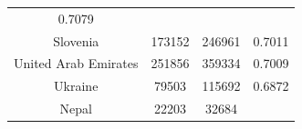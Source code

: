 \documentclass[10pt,]{article}
\begin{document}
\begin{longtable}[]{@{}cccc@{}}
\begin{minipage}[t]{0.18\columnwidth}
0.7079\strut
\end{minipage}\tabularnewline
\begin{minipage}[t]{0.26\columnwidth}\centering\strut
Slovenia\strut
\end{minipage} & \begin{minipage}[t]{0.12\columnwidth}\centering\strut
173152\strut
\end{minipage} & \begin{minipage}[t]{0.10\columnwidth}\centering\strut
246961\strut
\end{minipage} & \begin{minipage}[t]{0.18\columnwidth}\centering\strut
0.7011\strut
\end{minipage}\tabularnewline
\begin{minipage}[t]{0.26\columnwidth}\centering\strut
United Arab Emirates\strut
\end{minipage} & \begin{minipage}[t]{0.12\columnwidth}\centering\strut
251856\strut
\end{minipage} & \begin{minipage}[t]{0.10\columnwidth}\centering\strut
359334\strut
\end{minipage} & \begin{minipage}[t]{0.18\columnwidth}\centering\strut
0.7009\strut
\end{minipage}\tabularnewline
\begin{minipage}[t]{0.26\columnwidth}\centering\strut
Ukraine\strut
\end{minipage} & \begin{minipage}[t]{0.12\columnwidth}\centering\strut
79503\strut
\end{minipage} & \begin{minipage}[t]{0.10\columnwidth}\centering\strut
115692\strut
\end{minipage} & \begin{minipage}[t]{0.18\columnwidth}\centering\strut
0.6872\strut
\end{minipage}\tabularnewline
\begin{minipage}[t]{0.26\columnwidth}\centering\strut
Nepal\strut
\end{minipage} & \begin{minipage}[t]{0.12\columnwidth}\centering\strut
22203\strut
\end{minipage} & \begin{minipage}[t]{0.10\columnwidth}\centering\strut
32684\strut
\end{minipage} & \begin{minipage}[t]{0.18\columnwidth}\centering\strut

\end{minipage}
\end{longtable}
\end{document}
